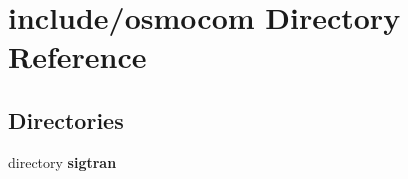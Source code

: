 \section{include/osmocom Directory Reference}
\label{dir_abe9b486a10ccc5afdf8abc29637e0c1}
\subsection*{Directories}
\begin{DoxyCompactItemize}
\item 
directory {\bf sigtran}
\end{DoxyCompactItemize}

